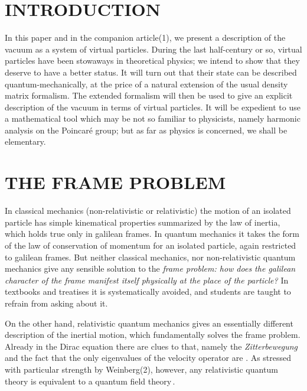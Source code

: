 \documentclass[a4paper,11pt]{article}
\begin{document}

\newpage

\section{INTRODUCTION}

In this paper and in the companion article(1), we present a description of the vacuum as a 
system of virtual particles. During the last half-century or so, virtual particles have been 
stowaways in theoretical physics; we intend to show that they deserve to have a better status. 
It will turn out that their state can be described quantum-mechanically, at the price of a 
natural extension of the usual density matrix formalism. The extended formalism will then be 
used to give an explicit description of the vacuum in terms of virtual particles. It will be 
expedient to use a mathematical tool which may be not so familiar to physicists, namely 
harmonic analysis on the Poincar\'e  group; but as far as physics is concerned, we shall be 
elementary.

\section{THE FRAME PROBLEM}

In classical mechanics (non-relativistic or relativistic) the motion of an isolated particle 
has simple kinematical properties summarized by the law of inertia, which holds true only in 
galilean frames. In quantum mechanics it takes the form of the law of conservation of momentum 
for an isolated particle, again restricted to galilean frames. But neither classical mechanics, 
nor non-relativistic quantum mechanics give any sensible solution to the {\it frame problem: 
how does the galilean character of the frame manifest itself physically at the place of the 
particle?} In textbooks and treatises it is systematically avoided, and students are taught to 
refrain from asking about it.

 On the other hand, relativistic quantum mechanics gives an essentially 
different description of the inertial motion, which fundamentally solves the frame problem. 
Already in the Dirac equation there are clues to that, namely the {\it Zitterbewegung} and the 
fact 
that the only eigenvalues of the velocity operator are \coordHE{}. As stressed with particular 
strength by Weinberg(2), however, any relativistic quantum theory is equivalent to a quantum 
field theory\,\footnotemark[3].
\end{document}
